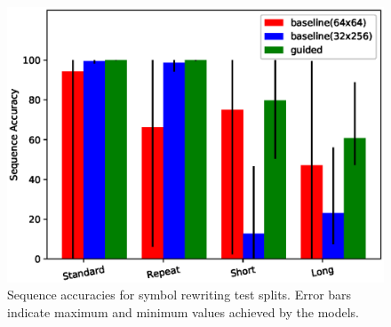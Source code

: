 \begin{figure}[H]
	\begin{minipage}[t]{\textwidth}
		\centering
		\includegraphics[width=\linewidth,keepaspectratio=true]{./figs/sr/sr-seq-eps}
		\caption{\small Sequence accuracies for symbol rewriting test splits. Error bars indicate maximum and minimum values achieved by the models.}
		\label{res:sr-acc}
	\end{minipage}
\end{figure}

